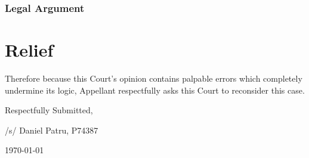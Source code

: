\documentclass[12pt,\documentclassflag]{michiganCourtOfAppealsBrief}
\begin{document}
\subsubsection{Legal Argument}
\section{Relief}

Therefore because this Court's opinion contains palpable errors which completely undermine its logic, Appellant respectfully asks this Court to reconsider this case.




\vspace{1\baselineskip}

{ \setlength{\leftskip}{3.5in}
  Respectfully Submitted,

  /s/ Daniel Patru, P74387

\today

  \setlength{\leftskip}{0pt}}


\newpage\empty%

\pagestyle{fancy}
\fancyhf{}
\fancyhead{}
\fancyfoot{}
\renewcommand\headrule{}

\newcommand{\addLabelsToAllIncludedPages}[1]{%
   \refstepcounter{includepdfpage}%
   \stepcounter{currentpagecounter}%
   \label{#1.\thecurrentpagecounter}}%

\newcommand{\myincludepdf}[2]{%
  \setcounter{currentpagecounter}{0}%
  {appendix/#1.pdf}}%
  
\end{document}
